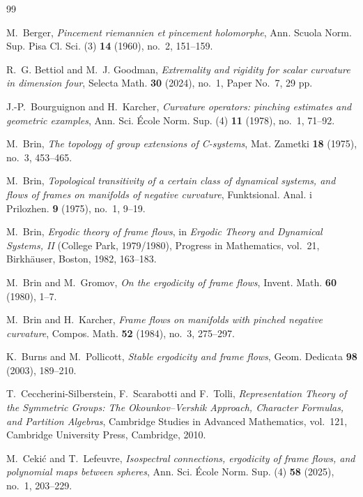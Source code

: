 \documentclass[reqno,11pt]{amsart}
\theoremstyle{definition}
\begin{document}
\begin{thebibliography}{99}

M.~Berger,
\emph{Pincement riemannien et pincement holomorphe},
Ann. Scuola Norm. Sup. Pisa Cl. Sci. (3) \textbf{14} (1960), no.~2,
151--159.

R.~G. Bettiol and M.~J. Goodman,
\emph{Extremality and rigidity for scalar curvature in dimension four},
Selecta Math. \textbf{30} (2024), no.~1, Paper No.~7, 29 pp.

J.-P.~Bourguignon and H.~Karcher,
\emph{Curvature operators: pinching estimates and geometric examples},
Ann. Sci. \'{E}cole Norm. Sup. (4) \textbf{11} (1978), no.~1, 71--92.

M.~Brin,
\emph{The topology of group extensions of C-systems},
Mat. Zametki \textbf{18} (1975), no.~3, 453--465.

M.~Brin,
\emph{Topological transitivity of a certain class of dynamical systems, and
flows of frames on manifolds of negative curvature},
Funktsional. Anal. i Prilozhen. \textbf{9} (1975), no.~1, 9--19.

M.~Brin,
\emph{Ergodic theory of frame flows},
in \emph{Ergodic Theory and Dynamical Systems, II} (College Park, 1979/1980),
Progress in Mathematics, vol.~21, Birkh\"auser, Boston, 1982, 163--183.

M.~Brin and M.~Gromov,
\emph{On the ergodicity of frame flows},
Invent. Math. \textbf{60} (1980), 1--7.

M.~Brin and H.~Karcher,
\emph{Frame flows on manifolds with pinched negative curvature},
Compos. Math. \textbf{52} (1984), no.~3, 275--297.

K.~Burns and M.~Pollicott,
\emph{Stable ergodicity and frame flows},
Geom. Dedicata \textbf{98} (2003), 189--210.

T.~Ceccherini-Silberstein, F.~Scarabotti and F.~Tolli,
\emph{Representation Theory of the Symmetric Groups:
The Okounkov--Vershik Approach, Character Formulas, and Partition Algebras},
Cambridge Studies in Advanced Mathematics, vol.~121,
Cambridge University Press, Cambridge, 2010.

M.~Ceki\'c and T.~Lefeuvre,
\emph{Isospectral connections, ergodicity of frame flows, and polynomial maps
between spheres},
Ann. Sci. \'{E}cole Norm. Sup. (4) \textbf{58} (2025), no.~1, 203--229.


\end{thebibliography}
\end{document}
